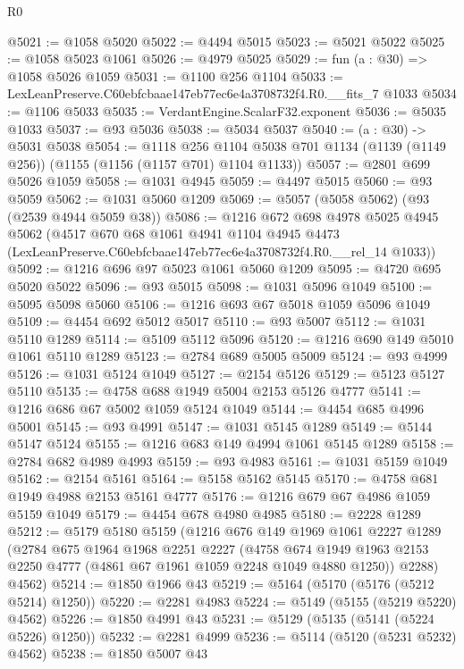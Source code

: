 \begin{lexlean}{R0}
\begin{coremodule}
@5021 := @1058 @5020
@5022 := @4494 @5015
@5023 := @5021 @5022
@5025 := @1058 @5023 @1061
@5026 := @4979 @5025
@5029 := fun (a : @30) => @1058 @5026 @1059
@5031 := @1100 @256 @1104
@5033 := LexLeanPreserve.C60ebfcbaae147eb77ec6e4a3708732f4.R0.__fits_7 @1033
@5034 := @1106 @5033
@5035 := VerdantEngine.ScalarF32.exponent
@5036 := @5035 @1033
@5037 := @93 @5036
@5038 := @5034 @5037
@5040 := (a : @30) -> @5031 @5038
@5054 := @1118
    @256
    @1104
    @5038
    @701
    @1134
    (@1139 (@1149 @256))
    (@1155 (@1156 (@1157 @701) @1104 @1133))
@5057 := @2801 @699 @5026 @1059
@5058 := @1031 @4945
@5059 := @4497 @5015
@5060 := @93 @5059
@5062 := @1031 @5060 @1209
@5069 := @5057 (@5058 @5062) (@93 (@2539 @4944 @5059 @38))
@5086 := @1216
    @672
    @698
    @4978
    @5025
    @4945
    @5062
    (@4517
      @670
      @68
      @1061
      @4941
      @1104
      @4945
      @4473
      (LexLeanPreserve.C60ebfcbaae147eb77ec6e4a3708732f4.R0.__rel_14 @1033))
@5092 := @1216 @696 @97 @5023 @1061 @5060 @1209
@5095 := @4720 @695 @5020 @5022
@5096 := @93 @5015
@5098 := @1031 @5096 @1049
@5100 := @5095 @5098 @5060
@5106 := @1216 @693 @67 @5018 @1059 @5096 @1049
@5109 := @4454 @692 @5012 @5017
@5110 := @93 @5007
@5112 := @1031 @5110 @1289
@5114 := @5109 @5112 @5096
@5120 := @1216 @690 @149 @5010 @1061 @5110 @1289
@5123 := @2784 @689 @5005 @5009
@5124 := @93 @4999
@5126 := @1031 @5124 @1049
@5127 := @2154 @5126
@5129 := @5123 @5127 @5110
@5135 := @4758 @688 @1949 @5004 @2153 @5126 @4777
@5141 := @1216 @686 @67 @5002 @1059 @5124 @1049
@5144 := @4454 @685 @4996 @5001
@5145 := @93 @4991
@5147 := @1031 @5145 @1289
@5149 := @5144 @5147 @5124
@5155 := @1216 @683 @149 @4994 @1061 @5145 @1289
@5158 := @2784 @682 @4989 @4993
@5159 := @93 @4983
@5161 := @1031 @5159 @1049
@5162 := @2154 @5161
@5164 := @5158 @5162 @5145
@5170 := @4758 @681 @1949 @4988 @2153 @5161 @4777
@5176 := @1216 @679 @67 @4986 @1059 @5159 @1049
@5179 := @4454 @678 @4980 @4985
@5180 := @2228 @1289
@5212 := @5179
    @5180
    @5159
    (@1216
      @676
      @149
      @1969
      @1061
      @2227
      @1289
      (@2784
        @675
        @1964
        @1968
        @2251
        @2227
        (@4758 @674 @1949 @1963 @2153 @2250 @4777 (@4861 @67 @1961 @1059 @2248 @1049 @4880 @1250))
        @2288)
      @4562)
@5214 := @1850 @1966 @43
@5219 := @5164 (@5170 (@5176 (@5212 @5214) @1250))
@5220 := @2281 @4983
@5224 := @5149 (@5155 (@5219 @5220) @4562)
@5226 := @1850 @4991 @43
@5231 := @5129 (@5135 (@5141 (@5224 @5226) @1250))
@5232 := @2281 @4999
@5236 := @5114 (@5120 (@5231 @5232) @4562)
@5238 := @1850 @5007 @43

\end{coremodule}
\end{lexlean}
